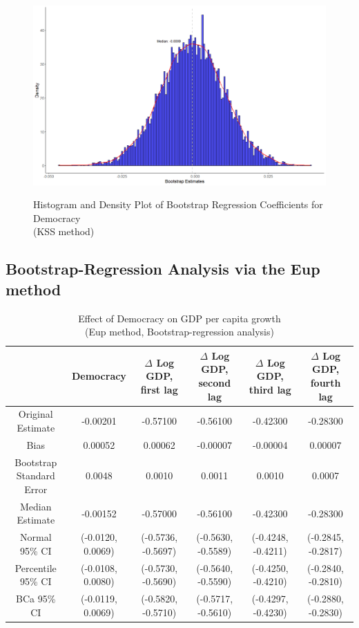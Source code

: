 \begin{appendix}
\begin{figure}[htb]
  \caption{Histogram and Density Plot of Bootstrap Regression Coefficients for Democracy \\
  (\ac{KSS} method)}
  \centering
  \includegraphics[width=\textwidth]{Images/kss_hist.png}
  \label{fig:image5}
\end{figure}


\subsection{Bootstrap-Regression Analysis via the \acs{Eup} method}\label{eup_apendix}

\begin{table}
\caption{Effect of Democracy on GDP per capita growth \\
(\ac{Eup} method, Bootstrap-regression analysis)}
\label{eup_results_appendix}
\footnotesize
\centering
\begin{tabular}{cccccc}
\hline
 & Democracy & $\Delta$ Log GDP, first lag &  $\Delta$ Log GDP, second lag & $\Delta$ Log GDP, third lag &  $\Delta$ Log GDP, fourth lag \\
\hline 
Original Estimate & -0.00201 & -0.57100 & -0.56100 & -0.42300 & -0.28300 \\
Bias & 0.00052 & 0.00062 & -0.00007 & -0.00004 & 0.00007 \\
Bootstrap Standard Error & 0.0048 & 0.0010 & 0.0011 & 0.0010 & 0.0007 \\
Median Estimate & -0.00152 & -0.57000 & -0.56100 & -0.42300 & -0.28300 \\
Normal 95\% CI & (-0.0120, 0.0069) & (-0.5736, -0.5697) & (-0.5630, -0.5589) & (-0.4248, -0.4211) & (-0.2845, -0.2817) \\
Percentile 95\% CI & (-0.0108, 0.0080) & (-0.5730, -0.5690) & (-0.5640, -0.5590) & (-0.4250, -0.4210) & (-0.2840, -0.2810) \\
BCa 95\% CI & (-0.0119, 0.0069) & (-0.5820, -0.5710) & (-0.5717, -0.5610) & (-0.4297, -0.4230) & (-0.2880, -0.2830) \\
\hline
\end{tabular}%
\end{table}
\end{appendix}
\clearpage







 

